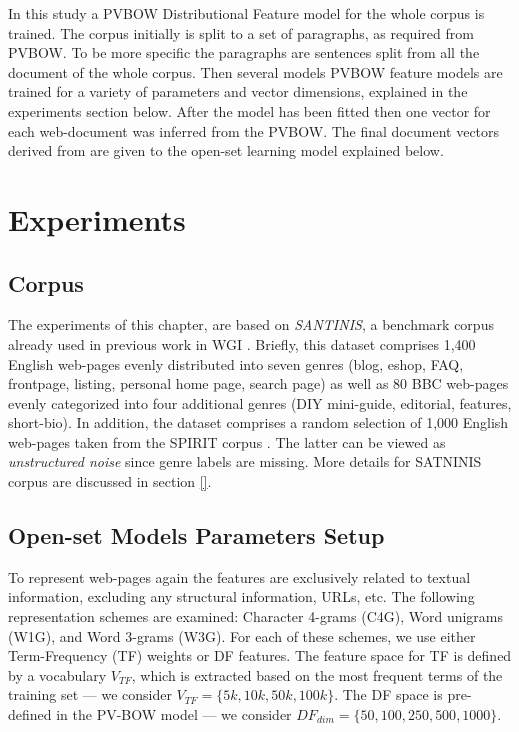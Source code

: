 In this study a PVBOW Distributional Feature model for the whole corpus is trained. The corpus initially is split to a set of paragraphs, as required from PVBOW. To be more specific the paragraphs are sentences split from all the document of the whole corpus. Then several models PVBOW feature models are trained for a variety of parameters and vector dimensions, explained in the experiments section below. After the model has been fitted then one vector for each web-document was inferred from the PVBOW. The final document vectors derived from  are given to the open-set learning model explained below. 


\section{Experiments}\label{chap:word_embeddings:sec:experiments_setup}

\subsection{Corpus}\label{chap:word_embeddings:sec:experiments_corpora}

The experiments of this chapter, are based on \textit{SANTINIS}, a benchmark corpus already used in previous work in WGI \parencite{mehler2010genres_on_web,pritsos2018open,santini2007automatic}. Briefly, this dataset comprises 1,400 English web-pages evenly distributed into seven genres (blog, eshop, FAQ, frontpage, listing, personal home page, search page) as well as 80 BBC web-pages evenly categorized into four additional genres (DIY mini-guide, editorial, features, short-bio). In addition, the dataset comprises a random selection of 1,000 English web-pages taken from the SPIRIT corpus \parencite{joho2004spirit}. The latter can be viewed as \emph{unstructured noise} since genre labels are missing. More details for SATNINIS corpus are discussed in section \ref{}. 


\subsection{Open-set Models Parameters Setup}\label{chap:word_embeddings:sec:experiments_params}

To represent web-pages again the features are exclusively related to textual information, excluding any structural information, URLs, etc. The following representation schemes are examined: Character 4-grams (C4G), Word unigrams (W1G), and Word 3-grams (W3G). For each of these schemes, we use either Term-Frequency (TF) weights or DF features. The feature space for TF is defined by a vocabulary $V_{TF}$, which is extracted based on the most frequent terms of the training set --- we consider $V_{TF}=\{5k,10k,50k,100k\}$. The DF space is pre-defined in the PV-BOW model --- we consider $DF_{dim}=\{50,100,250,500,1000\}$.

